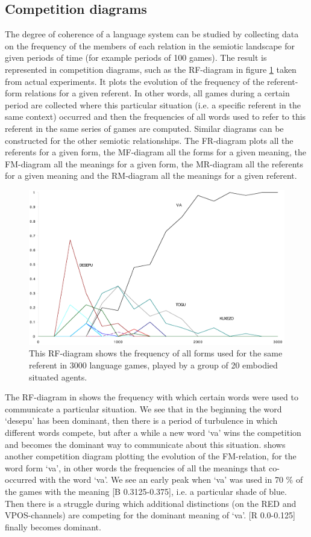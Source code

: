 \subsection{Competition diagrams}

The degree of coherence of a language system can be studied
by collecting data on the frequency of the members of 
each relation in the semiotic landscape for given periods of time
(for example periods of 100 games). The result is represented in
competition diagrams, such as the RF-diagram in figure
\ref{RF-diagram} taken from actual experiments. 
It plots the evolution of the frequency
of the referent-form relations for a given
referent. In other words, all games during a certain 
period are collected where this particular situation (i.e. 
a specific referent in the same context) occurred 
and then the frequencies of all words used to refer 
to this referent in the same series of games are computed. 
Similar diagrams can be constructed for the other
semiotic relationships. The FR-diagram plots all the referents
for a given form, the MF-diagram all the forms for a 
given meaning, the FM-diagram all the meanings for a 
given form, the MR-diagram all the referents for a given 
meaning and the RM-diagram all the meanings for a given 
referent. 

\begin{figure}[htbp]
  \centerline{\includegraphics[width=.80\textwidth]{chap7/figs/rf}}
\caption{ \label{RF-diagram} This RF-diagram shows
the frequency of all forms used for the same referent in 
3000 language games, played by a group of 20 embodied
situated agents.}
\end{figure}

The RF-diagram in  shows the 
frequency with which certain words were used to communicate 
a particular situation. We see that in
the beginning the word `desepu' has been dominant, then 
there is a period of turbulence in which different 
words compete, but after a while a new word `va' wins 
the competition and becomes the dominant way to communicate 
about this situation.  shows another
competition diagram plotting the evolution of the FM-relation, for 
the word form `va', in other words the frequencies of 
all the meanings that co-occurred with the word `va'. 
We see an early peak when `va' was used in 70 \% of the 
games with the meaning [B 0.3125-0.375], i.e. a particular
shade of blue. Then there is a struggle during which additional
distinctions (on the RED and VPOS-channels) are competing
for the dominant meaning of `va'. 
[R 0.0-0.125] finally becomes dominant. 

